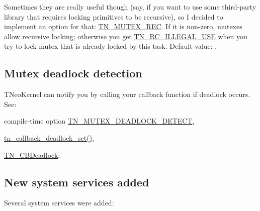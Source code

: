 Sometimes they are really useful though (say, if you want to use some third-\/party library that requires locking primitives to be recursive), so I decided to implement an option for that\+: {\ttfamily \hyperlink{tn__cfg__default_8h_a2557da78508c4241aceee92475df3581}{T\+N\+\_\+\+M\+U\+T\+E\+X\+\_\+\+R\+E\+C}}. If it is non-\/zero, mutexes allow recursive locking; otherwise you get {\ttfamily \hyperlink{tn__common_8h_aa43bd3da1ad4c1e61224b5f23b369876a2c83a60bf543df45b5045d6f7fbc7d0c}{T\+N\+\_\+\+R\+C\+\_\+\+I\+L\+L\+E\+G\+A\+L\+\_\+\+U\+S\+E}} when you try to lock mutex that is already locked by this task. Default value\+: {}.\hypertarget{tnkernel_diff_tnkernel_diff_mutex_deadlock}{}\subsection{Mutex deadlock detection}\label{tnkernel_diff_tnkernel_diff_mutex_deadlock}
T\+Neo\+Kernel can notify you by calling your callback function if deadlock occurs. See\+:


\begin{DoxyItemize}
\item compile-\/time option {\ttfamily \hyperlink{tn__cfg__default_8h_a6ed3ec7b0d4338e7f60dde86b7ea5fa4}{T\+N\+\_\+\+M\+U\+T\+E\+X\+\_\+\+D\+E\+A\+D\+L\+O\+C\+K\+\_\+\+D\+E\+T\+E\+C\+T}},
\item {\ttfamily \hyperlink{tn__sys_8h_aaa4a5c2feb4a0db5993b81dde496edc3}{tn\+\_\+callback\+\_\+deadlock\+\_\+set()}},
\item {\ttfamily \hyperlink{tn__sys_8h_ae8fd9ea5f9f265e638b56917bf1a5767}{T\+N\+\_\+\+C\+B\+Deadlock}}.
\end{DoxyItemize}\hypertarget{tnkernel_diff_tnkernel_diff_new_functions}{}\subsection{New system services added}\label{tnkernel_diff_tnkernel_diff_new_functions}
Several system services were added\+:


